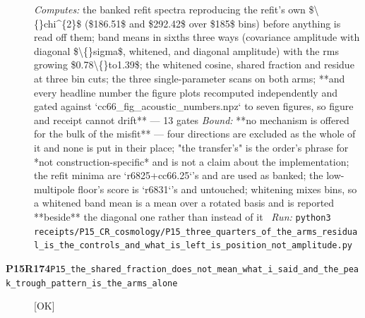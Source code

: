 \begin{description}
\emph{Computes:} the banked refit spectra reproducing the refit's own \$\textbackslash\{\}chi\textasciicircum{}\{2\}\$ (\$186.51\$ and \$292.42\$ over \$185\$ bins) before anything is read off them; band means in sixths three ways (covariance amplitude with diagonal \$\textbackslash\{\}sigma\$, whitened, and diagonal amplitude) with the rms growing \$0.78\textbackslash\{\}to1.39\$; the whitened cosine, shared fraction and residue at three bin cuts; the three single-parameter scans on both arms; **and every headline number the figure plots recomputed independently and gated against `cc66\_fig\_acoustic\_numbers.npz` to seven figures, so figure and receipt cannot drift** --- 13 gates
 \emph{Bound:}  **no mechanism is offered for the bulk of the misfit** --- four directions are excluded as the whole of it and none is put in their place; "the transfer's" is the order's phrase for *not construction-specific* and is not a claim about the implementation; the refit minima are `r6825+cc66.25`'s and are used as banked; the low-multipole floor's score is `r6831`'s and untouched; whitening mixes bins, so a whitened band mean is a mean over a rotated basis and is reported **beside** the diagonal one rather than instead of it
\ \emph{Run:} \texttt{python3 receipts/P15\_CR\_cosmology/P15\_three\_quarters\_of\_the\_arms\_residual\_is\_the\_controls\_and\_what\_is\_left\_is\_position\_not\_amplitude.py}
\item[\rcptlabel{P15_the_shared_fraction_does_not_mean_what_i_said_and_the_peak_trough_pattern_is_the_arms_alone}{P15R174}\textbf{P15R174}\quad\texttt{P15\_the\_shared\_fraction\_does\_not\_mean\_what\_i\_said\_and\_the\_peak\_trough\_pattern\_is\_the\_arms\_alone}]\hfill\textsf{[OK]}\\

\end{description}
